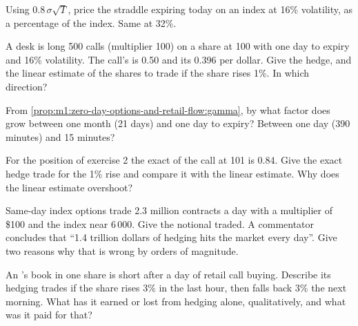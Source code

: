 \begin{exercise}[$\star$]\label{exo:m1:zero-day-options-and-retail-flow:1}
Using $0.8\,\sigma\sqrt{T}$, price the  straddle expiring today on
an index at 16\% volatility, as a percentage of the index. Same at 32\%.
\end{exercise}

\begin{exercise}[$\star$]\label{exo:m1:zero-day-options-and-retail-flow:2}
A desk is long 500  calls (multiplier 100) on a share at 100 with
one day to expiry and 16\% volatility. The call's  is 0.50 and its 
0.396 per dollar. Give the hedge, and the linear estimate of the shares to
trade if the share rises 1\%. In which direction?
\end{exercise}

\begin{exercise}[$\star$]\label{exo:m1:zero-day-options-and-retail-flow:3}
From \cref{prop:m1:zero-day-options-and-retail-flow:gamma}, by what factor
does   grow between one month (21 days) and one day to
expiry? Between one day (390 minutes) and 15 minutes?
\end{exercise}

\begin{exercise}[$\star\star$]\label{exo:m1:zero-day-options-and-retail-flow:4}
For the position of exercise 2 the exact  of the call at 101 is 0.84.
Give the exact hedge trade for the 1\% rise and compare it with the linear
estimate. Why does the linear estimate overshoot?
\end{exercise}

\begin{exercise}[$\star\star$]\label{exo:m1:zero-day-options-and-retail-flow:5}
Same-day index options trade 2.3 million contracts a day with a multiplier of
\$100 and the index near 6\,000. Give the notional traded. A commentator
concludes that ``1.4 trillion dollars of hedging hits the market every day''.
Give two reasons why that is wrong by orders of magnitude.
\end{exercise}

\begin{exercise}[$\star\star$]\label{exo:m1:zero-day-options-and-retail-flow:6}
An 's book in one share is short  after a day of
retail call buying. Describe its hedging trades if the share rises 3\% in the
last hour, then falls back 3\% the next morning. What has it earned or lost
from hedging alone, qualitatively, and what was it paid for that?
\end{exercise}

